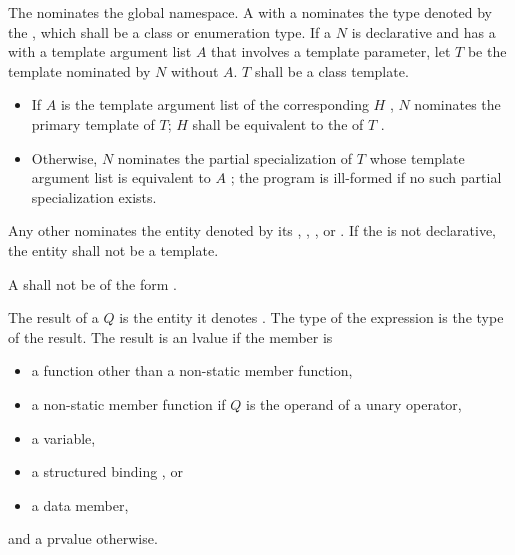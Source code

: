 \documentclass{wg21}
\begin{document}
\pnum
The  \tcode{::} nominates
the global namespace.
A  with a 
nominates the type denoted by the ,
which shall be a class or enumeration type.
If a  $N$
is declarative and
has a  with a template argument list $A$
that involves a template parameter,
let $T$ be the template nominated by $N$ without $A$.
$T$ shall be a class template.
\begin{itemize}
    \item
    {If $A$ is the template argument list  of
    the corresponding  $H$ ,
    $N$ nominates the primary template of $T$;
    $H$ shall be equivalent to
    the  of $T$ .}
    \item
    {Otherwise, $N$ nominates the partial specialization  of $T$
    whose template argument list is equivalent to $A$ ;
    the program is ill-formed if no such partial specialization exists.}
\end{itemize}
Any other  nominates
the entity denoted by its
,
,
, or
.
If the  is not declarative,
the entity shall not be a template.

\pnum
A  shall not be of the form
  \tcode{\~}
 \tcode{::} \tcode{\~} 
.

\pnum
The result of a  $Q$ is
the entity it denotes .
The type of the expression is the type of the result.
The result is an lvalue if the member is
\begin{itemize}
    \item
    a function other than a non-static member function,
    \item
    a non-static member function
    if $Q$ is the operand of a unary \tcode{\&} operator,
    \item
    a variable,
    \item
    a structured binding , or
    \item
    a data member,
\end{itemize}
and a prvalue otherwise.
\end{document}
